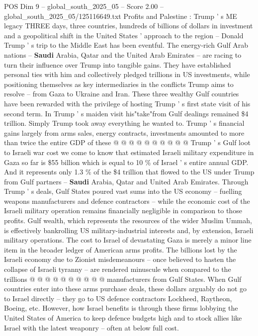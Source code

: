 \begin{textsample}{POS Dim 9 – global\_south\_2025\_05 – Score 2.00 – global\_south\_2025\_05/125116649.txt}  \label{ex:f9_pos_216}
Profits and Palestine : Trump ' s ME legacy THREE days, three countries, hundreds of billions of dollars in investment and a geopolitical shift in the United States ' approach to the region -- Donald Trump ' s trip to the Middle East has been eventful.
The energy-rich Gulf Arab nations -- \textbf{Saudi} Arabia, Qatar and the United Arab Emirates -- are racing to turn their influence over Trump into tangible gains.
They have established personal ties with him and collectively pledged trillions in US investments, while positioning themselves as key intermediaries in the conflicts Trump aims to resolve -- from Gaza to Ukraine and Iran.
These three wealthy Gulf countries have been rewarded with the privilege of hosting Trump ' s first state visit of his second term.
In Trump ' s maiden visit his"take"from Gulf dealings remained \$4 trillion.
Simply Trump took away everything he wanted to.
Trump ' s financial gains largely from arms sales, energy contracts, investments amounted to more than twice the entire GDP of these @ @ @ @ @ @ @ @ @ @ Trump ' s Gulf loot to Israeli war cost we come to know that estimated Israeli military expenditure in Gaza so far is \$55 billion which is equal to 10 \% of Israel ' s entire annual GDP.
And it represents only 1.3 \% of the \$4 trillion that flowed to the US under Trump from Gulf partners -- \textbf{Saudi} Arabia, Qatar and United Arab Emirates.
Through Trump ' s deals, Gulf States poured vast sums into the US economy -- fuelling weapons manufacturers and defence contractors -- while the economic cost of the Israeli military operation remains financially negligible in comparison to those profits.
Gulf wealth, which represents the resources of the wider Muslim Ummah, is effectively bankrolling US military-industrial interests and, by extension, Israeli military operations.
The cost to Israel of devastating Gaza is merely a minor line item in the broader ledger of American arms profits.
The billions lost by the Israeli economy due to Zionist misdemeanours -- once believed to hasten the collapse of Israeli tyranny -- are rendered minuscule when compared to the trillions @ @ @ @ @ @ @ @ @ @ manufacturers from Gulf States.
When Gulf countries enter into these arms purchase deals, these dollars arguably do not go to Israel directly -- they go to US defence contractors Lockheed, Raytheon, Boeing, etc.
However, how Israel benefits is through these firms lobbying the United States of America to keep defence budgets high and to stock allies like Israel with the latest weaponry -- often at below full cost.

\end{textsample}
